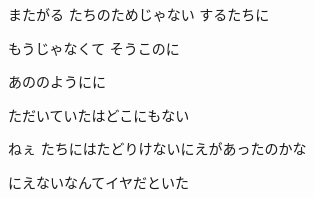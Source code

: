 \documentclass[14pt]{ltjsarticle}
\begin{document}
{\item
  またがる たちのためじゃない するたちに
  \jisho{}

\item
  もうじゃなくて そうこのに
  \jisho{}

  あののようにに
  \jisho{}

  ただいていたはどこにもない
  \jisho{}

  ねぇ たちにはたどりけないにえがあったのかな
  \jisho{}

  にえないなんてイヤだといた
  \jisho{}


}
\end{document}
